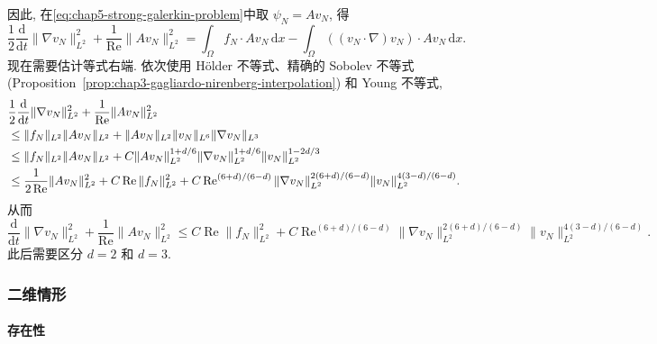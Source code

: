 因此, 在\eqref{eq:chap5-strong-galerkin-problem}中取 $\psi_N=Av_N$, 得
\[
 \frac12\frac{\mathrm d}{\mathrm dt}\|\nabla v_N\|_{L^2}^2
 +\frac1{\operatorname{Re}}\|Av_N\|_{L^2}^2
 =\int_\Omega f_N\cdot Av_N\,\mathrm dx
 -\int_\Omega((v_N\cdot\nabla)v_N)\cdot Av_N\,\mathrm dx.
\]
现在需要估计等式右端. 依次使用 Hölder 不等式、精确的 Sobolev 不等式 (Proposition~\ref{prop:chap3-gagliardo-nirenberg-interpolation}) 和 Young 不等式,
\begin{align*}
 &\frac12\frac{\mathrm d}{\mathrm dt}\|\nabla v_N\|_{L^2}^2
 +\frac1{\operatorname{Re}}\|Av_N\|_{L^2}^2\notag\\
 &\leq\|f_N\|_{L^2}\|Av_N\|_{L^2}
 +\|Av_N\|_{L^2}\|v_N\|_{L^6}\|\nabla v_N\|_{L^3}\notag\\
 &\leq\|f_N\|_{L^2}\|Av_N\|_{L^2}
 +C\|Av_N\|_{L^2}^{1+d/6}\|\nabla v_N\|_{L^2}^{1+d/6}
 \|v_N\|_{L^2}^{1-2d/3}\notag\\
 &\leq\frac1{2\operatorname{Re}}\|Av_N\|_{L^2}^2
 +C\operatorname{Re}\|f_N\|_{L^2}^2
 +C\operatorname{Re}^{(6+d)/(6-d)}
 \|\nabla v_N\|_{L^2}^{2(6+d)/(6-d)}
 \|v_N\|_{L^2}^{4(3-d)/(6-d)}.
\end{align*}
从而
\begin{equation}
 \frac{\mathrm d}{\mathrm dt}\|\nabla v_N\|_{L^2}^2
 +\frac1{\operatorname{Re}}\|Av_N\|_{L^2}^2
 \leq C\operatorname{Re}\|f_N\|_{L^2}^2
 +C\operatorname{Re}^{(6+d)/(6-d)}
 \|\nabla v_N\|_{L^2}^{2(6+d)/(6-d)}
 \|v_N\|_{L^2}^{4(3-d)/(6-d)}.
\label{eq:chap5-strong-master-estimate}
\end{equation}
此后需要区分 $d=2$ 和 $d=3$.

\subsubsection{二维情形}
\label{subsec:chap5-strong-two-dimensional}

\paragraph{存在性}
\label{subsec:chap5-strong-two-dimensional-existence}

